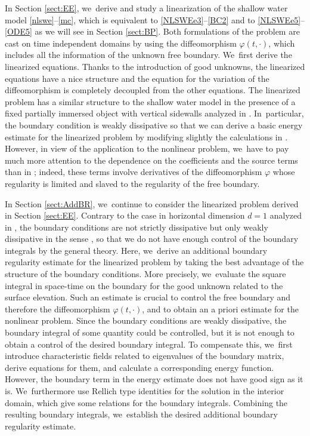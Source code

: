 In Section \ref{sect:EE}, we~derive and study a linearization of the shallow water model \eqref{nlswe}--\eqref{mc}, which is equivalent to
\eqref{NLSWEe3}--\eqref{BC2} and to \eqref{NLSWEe5}--\eqref{ODE5} as we will see in Section \ref{sect:BP}.
Both formulations of the problem are cast on time independent domains by using the diffeomorphism $\varphi(t,\cdot)$,
which includes all the information of the unknown free boundary. We~first derive the linearized equations.
Thanks to the introduction of good unknowns, the linearized equations have a nice structure and the equation for the variation of the diffeomorphism is completely
decoupled from the other equations.
The linearized problem has a similar structure to the shallow water model in the presence of a fixed partially immersed object with vertical sidewalls
analyzed in \cite{IguchiLannes2023}. In~particular, the boundary condition is weakly dissipative so that
we can derive a basic energy estimate for the linearized problem by modifying slightly the calculations in \cite{IguchiLannes2023}.
However, in view of the application to the nonlinear problem, we~have to pay much more attention to the dependence on the coefficients and the source terms
than in \cite{IguchiLannes2023};
indeed, these terms involve derivatives of the diffeomorphism $\varphi$ whose regularity is limited and slaved to the regularity of the free boundary.

In Section \ref{sect:AddBR}, we~continue to consider the linearized problem derived in Section \ref{sect:EE}.
Contrary to the case in horizontal dimension $d=1$ analyzed in \cite{IguchiLannes2021},
the boundary conditions are not strictly dissipative but only weakly dissipative in the sense \cite{IguchiLannes2023},
so that we do not have enough control of the boundary integrals by the general theory.
Here, we~derive an additional boundary regularity estimate for the linearized problem by taking the best advantage of the structure of the boundary conditions.
More precisely, we~evaluate the square integral in space-time on the boundary for the good unknown related to the surface elevation.
Such an estimate is crucial to control the free boundary and therefore the diffeomorphism $\varphi(t,\cdot)$,
and to obtain an a priori estimate for the nonlinear problem.
Since the boundary conditions are weakly dissipative, the boundary integral of some quantity could be controlled,
but it is not enough to obtain a control of the desired boundary integral.
To compensate this, we~first introduce characteristic fields related to eigenvalues of the boundary matrix,
derive equations for them, and calculate a corresponding energy function.
However, the boundary term in the energy estimate does not have good sign as it is. We~furthermore use Rellich type identities for the solution in the interior domain, which give some relations for the boundary integrals.
Combining the resulting boundary integrals, we~establish the desired additional boundary regularity estimate.

